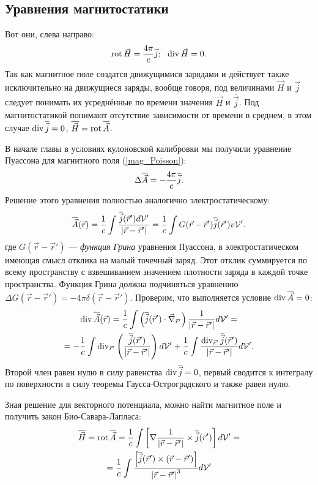 \subsection{Уравнения магнитостатики}
    Вот они, слева направо:
    \[
        \operatorname{rot}\vec{H} = \frac{4\pi}{c}\vec{j}; \:\:\: \operatorname{div}\vec{H} = 0.
    \]
    Так как магнитное поле создатся движущимися зарядами и действует также исключительно на движущиеся заряды, вообще говоря,
    под величинами $\vec{H}$ и $\vec{j}$ следует понимать их усреднённые по времени значения $\overline{\vec{H}}$ и $\overline{\vec{j}}$.
    Под магнитостатикой понимают отсутствие зависимости от времени в среднем, в этом случае $\operatorname{div}\overline{\vec{j}} = 0$, $\overline{\vec{H}} = \operatorname{rot}\overline{\vec{A}}$.
    
    В начале главы в условиях кулоновской калибровки мы получили уравнение Пуассона для магнитного поля (\ref{mag_Poisson}):
    \[
        \Delta\overline{\vec{A}} = -\frac{4\pi}{c}\overline{\vec{j}}.
    \]
    Решение этого уравнения полностью аналогично электростатическому:
    \[
        \overline{\vec{A}}(\vec{r}) = \frac{1}{c}\int \frac{\overline{\vec{j}}(\vec{r}')d\mathcal{V}'}{\left|{\vec{r} - \vec{r}'}\right|} = 
        \frac 1c \int G(\vec{r} - \vec{r}')\overline{\vec{j}}(\vec{r}')v\mathcal{V}'.
    \]
    где $G(\vec{r} - \vec{r}')$ --- \textit{функция Грина} уравнения Пуассона, в электростатическом имеющая смысл отклика на малый точечный заряд.
    Этот отклик суммируется по всему пространству с взвешиванием значением плотности заряда в каждой точке пространства.
    Функция Грина должна подчиняться уравнению
    $\Delta G(\vec{r} - \vec{r}') = -4\pi\delta(\vec{r} - \vec{r}')$.
    Проверим, что выполняется условие $\operatorname{div}\overline{\vec{A}} = 0$:
    \begin{gather*}
        \operatorname{div}\overline{\vec{A}}(\vec{r}) = \frac 1c \int \left({\overline{\vec{j}}(\vec{r}') \cdot \vec{\nabla}_{\vec{r}'}}\right)\frac{1}{\left|{\vec{r} - \vec{r}'}\right|}d\mathcal{V}' = \\ =
        -\frac 1c \int \operatorname{div}_{\vec{r}'}\left({\frac{\overline{\vec{j}}(\vec{r}')}{\left|{\vec{r} - \vec{r}'}\right|}}\right)d\mathcal{V}' + 
        \frac 1c \int\frac{\operatorname{div}_{\vec{r}'}\overline{\vec{j}}(\vec{r}')}{\left|{\vec{r} - \vec{r}'}\right|}d\mathcal{V}'.
    \end{gather*}
    Второй член равен нулю в силу равенства $\operatorname{div}\overline{\vec{j}} = 0$, первый сводится к интегралу по поверхности в силу теоремы Гаусса-Остроградского
    и также равен нулю.

    Зная решение для векторного потенциала, можно найти магнитное поле и получить закон Био-Савара-Лапласа:
    \begin{gather*}
        \overline{\vec{H}} = \operatorname{rot}\overline{\vec{A}} = \frac 1c \int \left[{\nabla\frac{1}{\left|{\vec{r} - \vec{r}'}\right|} \times \overline{\vec{j}}(\vec{r}')}\right]d\mathcal{V}' = \\ =
        \frac 1c \int \frac{\left[{\overline{\vec{j}}(\vec{r}') \times \left({\vec{r} - \vec{r}'}\right)}\right]}{\left|{\vec{r} - \vec{r}'}\right|^3}d\mathcal{V}'
    \end{gather*}

